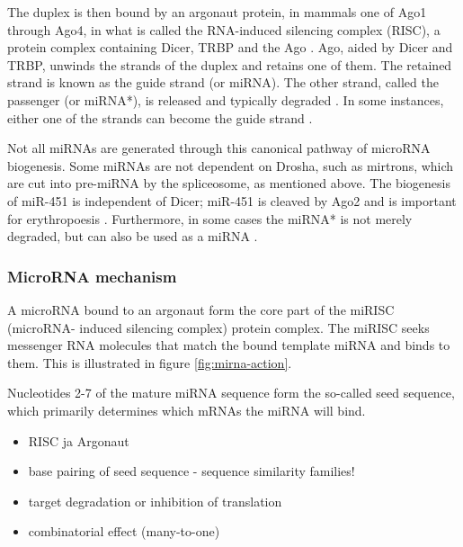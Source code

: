 The duplex is then bound by an argonaut protein, in mammals one of Ago1
through Ago4, in what is called the RNA-induced silencing complex (RISC), a
protein complex containing Dicer, TRBP and the Ago \citep{Gregory2005}. Ago,
aided by Dicer and TRBP, unwinds the strands of the duplex and retains one of
them. The retained strand is known as the guide strand (or miRNA). The other
strand, called the passenger (or miRNA*), is released and typically degraded .
In some instances, either one of the strands can become the guide strand
\citep{Ruby2006}.

Not all miRNAs are generated through this canonical pathway of microRNA
biogenesis. Some miRNAs are not dependent on Drosha, such as mirtrons, which
are cut into pre-miRNA by the spliceosome, as mentioned above. The biogenesis of
miR-451 is independent of Dicer; miR-451 is cleaved by Ago2 and is
important for erythropoesis \citep{Cheloufi2010}. Furthermore, in some cases
the miRNA* is not merely degraded, but can also be used as a miRNA
\citep{Czech2009}.





\subsubsection{MicroRNA mechanism}\label{microrna-mechanism}

A microRNA bound to an argonaut form the core part of the miRISC (microRNA-
induced silencing complex) protein complex. The miRISC seeks messenger RNA
molecules that match the bound template miRNA and binds to them. This is illustrated
in figure \ref{fig:mirna-action}.

Nucleotides 2-7 of the mature miRNA sequence form the so-called seed sequence, which primarily
determines which mRNAs the miRNA will bind.

\begin{itemize}
\item
  RISC ja Argonaut
\item
  base pairing of seed sequence - sequence similarity families!
\item
  target degradation or inhibition of translation
\item
  combinatorial effect (many-to-one)
\end{itemize}





